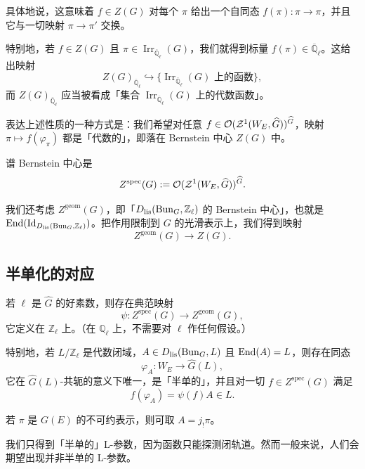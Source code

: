 具体地说，这意味着 $f\in Z(G)$ 对每个 $\pi$ 给出一个自同态 $f(\pi)\colon\pi\to\pi$，并且它与一切映射 $\pi\to\pi'$ 交换。

特别地，若 $f\in Z(G)$ 且 $\pi\in\operatorname{Irr}_{\overline{\mathbb Q}_\ell}(G)$，我们就得到标量 $f(\pi)\in\overline{\mathbb Q}_\ell$。这给出映射
\[
Z(G)_{\overline{\mathbb Q}_\ell}\hookrightarrow\{\operatorname{Irr}_{\overline{\mathbb Q}_\ell}(G)\text{ 上的函数}\},
\]
而 $Z(G)_{\overline{\mathbb Q}_\ell}$ 应当被看成「集合 $\operatorname{Irr}_{\overline{\mathbb Q}_\ell}(G)$ 上的代数函数」。

表达上述性质的一种方式是：我们希望对任意 $f\in\mathcal O(\mathcal{Z}^1(W_E,\widehat G))^{\widehat G}$，映射 $\pi\mapsto f(\varphi_\pi)$ 都是「代数的」，即落在 Bernstein 中心 $Z(G)$ 中。

\begin{definition}
谱 Bernstein 中心是
\[
Z^{\mathrm{spec}}(G):=\mathcal O(\mathcal{Z}^1(W_E,\widehat G))^{\widehat G}.
\]
\end{definition}

我们还考虑 $Z^{\mathrm{geom}}(G)$，即「$D_{\mathrm{lis}}(\mathrm{Bun}_G,\mathbb Z_\ell)$ 的 Bernstein 中心」，也就是 $\operatorname{End}(\operatorname{Id}_{D_{\mathrm{lis}}(\mathrm{Bun}_G,\mathbb Z_\ell)})$。把作用限制到 $G$ 的光滑表示上，我们得到映射
\[
Z^{\mathrm{geom}}(G)\to Z(G).
\]

\subsection{半单化的对应}

\begin{theorem}[Fargues--S]
若 $\ell$ 是 $\widehat G$ 的好素数，则存在典范映射
\[
\psi\colon Z^{\mathrm{spec}}(G)\to Z^{\mathrm{geom}}(G),
\]
它定义在 $\mathbb Z_\ell$ 上。（在 $\mathbb Q_\ell$ 上，不需要对 $\ell$ 作任何假设。）

特别地，若 $L/\mathbb Z_\ell$ 是代数闭域，$A\in D_{\mathrm{lis}}(\mathrm{Bun}_G,L)$ 且 $\operatorname{End}(A)=L$，则存在同态
\[
\varphi_A\colon W_E\to\widehat G(L),
\]
它在 $\widehat G(L)$-共轭的意义下唯一，是「半单的」，并且对一切 $f\in Z^{\mathrm{spec}}(G)$ 满足
\[
f(\varphi_A)=\psi(f)A\in L.
\]
\end{theorem}


\begin{example}
若 $\pi$ 是 $G(E)$ 的不可约表示，则可取 $A=j_!\pi$。
\end{example}

\begin{remark}
我们只得到「半单的」L-参数，因为函数只能探测闭轨道。然而一般来说，人们会期望出现并非半单的 L-参数。
\end{remark}

